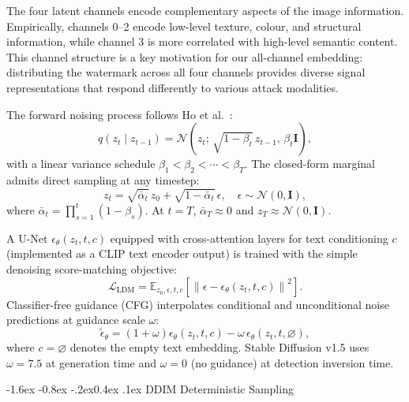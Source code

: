 \documentclass[10pt,twocolumn]{article}
\makeatletter
\renewcommand\subsection{\@startsection{subsection}{2}{\z@}%
  {-1.6ex \@plus -0.8ex \@minus -.2ex}{0.4ex \@plus .1ex}%
  {\normalfont\normalsize\itshape}}
\makeatother
\begin{document}
The four latent channels encode complementary aspects of the image
information.
Empirically, channels 0--2 encode low-level texture, colour, and
structural information, while channel 3 is more correlated with
high-level semantic content.
This channel structure is a key motivation for our all-channel
embedding: distributing the watermark across all four channels
provides diverse signal representations that respond differently
to various attack modalities.

The forward noising process follows Ho et al.~\cite{ho2020ddpm}:
\begin{equation}
  q(z_t \mid z_{t-1}) =
    \mathcal{N}\!\left(z_t;\,\sqrt{1-\beta_t}\,z_{t-1},\,\beta_t\mathbf{I}\right),
  \label{eq:forward}
\end{equation}
with a linear variance schedule $\beta_1 < \beta_2 < \cdots < \beta_T$.
The closed-form marginal admits direct sampling at any timestep:
\begin{equation}
  z_t = \sqrt{\bar\alpha_t}\,z_0
        + \sqrt{1-\bar\alpha_t}\,\epsilon,\quad
  \epsilon\sim\mathcal{N}(0,\mathbf{I}),
  \label{eq:marginal}
\end{equation}
where $\bar\alpha_t = \prod_{s=1}^{t}(1-\beta_s)$.
At $t{=}T$, $\bar\alpha_T \approx 0$ and
$z_T \approx \mathcal{N}(0,\mathbf{I})$.

A U-Net $\epsilon_\theta(z_t, t, c)$ equipped with cross-attention
layers for text conditioning $c$ (implemented as a CLIP text encoder
output) is trained with the simple denoising score-matching objective:
\begin{equation}
  \mathcal{L}_{\mathrm{LDM}} = \mathbb{E}_{z_0,\epsilon,t,c}
    \!\left[\left\|\epsilon - \epsilon_\theta(z_t,t,c)\right\|^2\right].
  \label{eq:obj}
\end{equation}
Classifier-free guidance (CFG) interpolates conditional and
unconditional noise predictions at guidance scale $\omega$:
\begin{equation}
  \tilde\epsilon_\theta = (1+\omega)\epsilon_\theta(z_t,t,c)
                        - \omega\,\epsilon_\theta(z_t,t,\varnothing),
  \label{eq:cfg}
\end{equation}
where $c{=}\varnothing$ denotes the empty text embedding.
Stable Diffusion v1.5 uses $\omega{=}7.5$ at generation time and
$\omega{=}0$ (no guidance) at detection inversion time.

\subsection{DDIM Deterministic Sampling}
\end{document}

